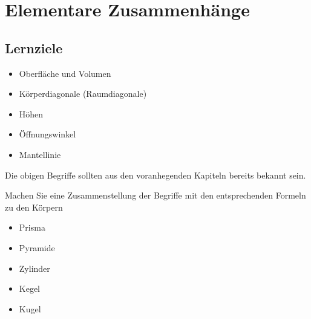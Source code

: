 \section{Elementare Zusammenhänge}
\sectuntertitel{}


\subsection*{Lernziele}
\begin{itemize}
\item Oberfläche und Volumen
\item Körperdiagonale (Raumdiagonale)
\item Höhen
\item Öffnungswinkel
\item Mantellinie
\end{itemize}

Die obigen Begriffe sollten aus den voranhegenden Kapiteln bereits
bekannt sein.

Machen Sie eine Zusammenstellung der Begriffe mit den entsprechenden
Formeln zu den Körpern
\begin{itemize}
\item Prisma
\item Pyramide
\item Zylinder
\item Kegel
\item Kugel
\end{itemize}


\newpage

